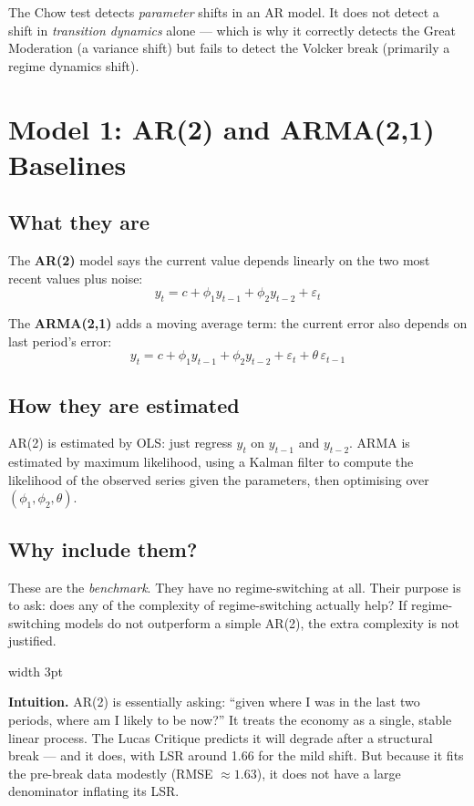 \documentclass[11pt, a4paper]{article}
\newenvironment{intubox}{%
  \vspace{4pt}\par\noindent%
  {\color{darkblue}\vrule width 3pt}\hspace{6pt}%
  \begin{minipage}{\dimexpr\linewidth-9pt\relax}\vspace{2pt}%
}{%
  \vspace{2pt}\end{minipage}\par\vspace{4pt}%
}
\begin{document}
The Chow test detects \emph{parameter} shifts in an AR model. It
does not detect a shift in \emph{transition dynamics} alone --- which is why it
correctly detects the Great Moderation (a variance shift) but fails to detect
the Volcker break (primarily a regime dynamics shift).

\section{Model 1: AR(2) and ARMA(2,1) Baselines}

\subsection{What they are}

The \textbf{AR(2)} model says the current value depends linearly on the two
most recent values plus noise:
\[
  y_t = c + \phi_1 y_{t-1} + \phi_2 y_{t-2} + \varepsilon_t
\]

The \textbf{ARMA(2,1)} adds a moving average term: the current error also
depends on last period's error:
\[
  y_t = c + \phi_1 y_{t-1} + \phi_2 y_{t-2} + \varepsilon_t + \theta\,\varepsilon_{t-1}
\]

\subsection{How they are estimated}

AR(2) is estimated by OLS: just regress $y_t$ on $y_{t-1}$ and $y_{t-2}$.
ARMA is estimated by maximum likelihood, using a Kalman filter to compute
the likelihood of the observed series given the parameters, then optimising
over $(\phi_1, \phi_2, \theta)$.

\subsection{Why include them?}

These are the \emph{benchmark}. They have no regime-switching at all. Their
purpose is to ask: does any of the complexity of regime-switching actually
help? If regime-switching models do not outperform a simple AR(2), the extra
complexity is not justified.

\begin{intubox}
\textbf{Intuition.}
AR(2) is essentially asking: ``given where I was in the last two periods, where
am I likely to be now?'' It treats the economy as a single, stable linear
process. The Lucas Critique predicts it will degrade after a structural break
--- and it does, with LSR around 1.66 for the mild shift. But because it fits
the pre-break data modestly (RMSE $\approx 1.63$), it does not have a large
denominator inflating its LSR.
\end{intubox}
\end{document}
